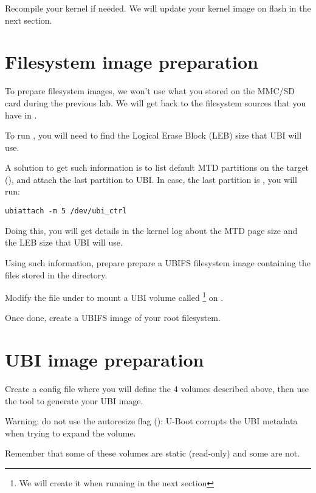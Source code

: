 Recompile your kernel if needed. We will update your kernel image on flash
in the next section.

\section{Filesystem image preparation}

To prepare filesystem images, we won't use what you stored on the MMC/SD
card during the previous lab. We will get back to the filesystem sources
that you have in .

To run , you will need to find the Logical Erase
Block (LEB) size that UBI will use.

A solution to get such information is to list default MTD partitions
on the target (), and attach the last partition
to UBI. In case, the last partition is , you will run:

\begin{verbatim}
ubiattach -m 5 /dev/ubi_ctrl
\end{verbatim}

Doing this, you will get details in the kernel log about the MTD page
size and the LEB size that UBI will use.

Using such information, prepare prepare a UBIFS filesystem
image containing the files stored in the  directory.

Modify the  file under  to mount a
UBI volume called  \footnote{We will create it when
running  in the next section} on .

Once done, create a UBIFS image of your root filesystem.

\section{UBI image preparation}

Create a  config file where you will define the 4 volumes
described above, then use the  tool to generate your
UBI image.

Warning: do not use the autoresize flag ():
U-Boot corrupts the UBI metadata when trying to expand the volume.

Remember that some of these volumes are static (read-only) and some are
not.

%
%

